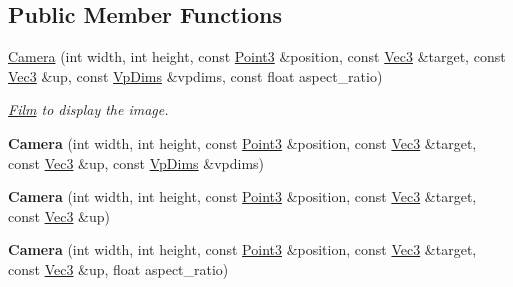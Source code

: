 \subsection*{Public Member Functions}
\begin{DoxyCompactItemize}
\item 
\mbox{\label{classomg_1_1_camera_a9c62e23a47414cc9838222f69b37ca8f}} 
\mbox{\hyperlink{classomg_1_1_camera_a9c62e23a47414cc9838222f69b37ca8f}{Camera}} (int width, int height, const \mbox{\hyperlink{namespaceomg_af85242d35fdacf829d32a6f9b95f3e35}{Point3}} \&position, const \mbox{\hyperlink{namespaceomg_a45a9482677fee9933ff369b49894e316}{Vec3}} \&target, const \mbox{\hyperlink{namespaceomg_a45a9482677fee9933ff369b49894e316}{Vec3}} \&up, const \mbox{\hyperlink{structomg_1_1_camera_1_1_vp_dims}{Vp\+Dims}} \&vpdims, const float aspect\+\_\+ratio)
\begin{DoxyCompactList}\small\item\em \mbox{\hyperlink{classomg_1_1_film}{Film}} to display the image. \end{DoxyCompactList}\item 
\mbox{\label{classomg_1_1_camera_ab538762b7a5ab089146209f1325dde59}} 
{\bfseries Camera} (int width, int height, const \mbox{\hyperlink{namespaceomg_af85242d35fdacf829d32a6f9b95f3e35}{Point3}} \&position, const \mbox{\hyperlink{namespaceomg_a45a9482677fee9933ff369b49894e316}{Vec3}} \&target, const \mbox{\hyperlink{namespaceomg_a45a9482677fee9933ff369b49894e316}{Vec3}} \&up, const \mbox{\hyperlink{structomg_1_1_camera_1_1_vp_dims}{Vp\+Dims}} \&vpdims)
\item 
\mbox{\label{classomg_1_1_camera_a5812def5e5ccf91b585467d4bd899306}} 
{\bfseries Camera} (int width, int height, const \mbox{\hyperlink{namespaceomg_af85242d35fdacf829d32a6f9b95f3e35}{Point3}} \&position, const \mbox{\hyperlink{namespaceomg_a45a9482677fee9933ff369b49894e316}{Vec3}} \&target, const \mbox{\hyperlink{namespaceomg_a45a9482677fee9933ff369b49894e316}{Vec3}} \&up)
\item 
\mbox{\label{classomg_1_1_camera_a4640624d27e5994e910da36d4cb0aef8}} 
{\bfseries Camera} (int width, int height, const \mbox{\hyperlink{namespaceomg_af85242d35fdacf829d32a6f9b95f3e35}{Point3}} \&position, const \mbox{\hyperlink{namespaceomg_a45a9482677fee9933ff369b49894e316}{Vec3}} \&target, const \mbox{\hyperlink{namespaceomg_a45a9482677fee9933ff369b49894e316}{Vec3}} \&up, float aspect\+\_\+ratio)

\end{DoxyCompactItemize}
